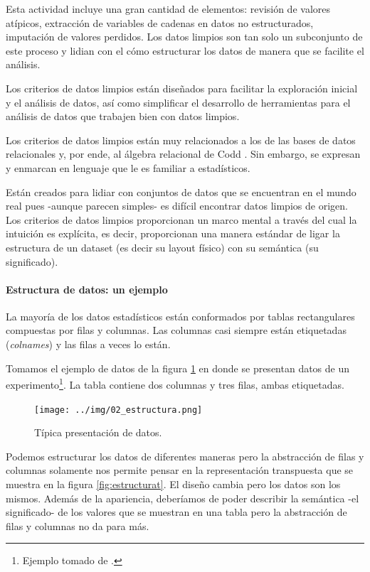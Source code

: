 \documentclass[]{article}
\let\oldparagraph\paragraph
\renewcommand{\paragraph}[1]{\oldparagraph{#1}\mbox{}}
\let\rmarkdownfootnote\footnote%
\def\footnote{\protect\rmarkdownfootnote}
\begin{document}
Esta actividad incluye una gran cantidad de elementos: revisión de
valores atípicos, extracción de variables de cadenas en datos no
estructurados, imputación de valores perdidos. Los datos limpios son tan
solo un subconjunto de este proceso y lidian con el cómo estructurar los
datos de manera que se facilite el análisis.

Los criterios de datos limpios están diseñados para facilitar la
exploración inicial y el análisis de datos, así como simplificar el
desarrollo de herramientas para el análisis de datos que trabajen bien
con datos limpios.

Los criterios de datos limpios están muy relacionados a los de las bases
de datos relacionales y, por ende, al álgebra relacional de Codd
\parencite{wickham2014tidy}. Sin embargo, se expresan y enmarcan en
lenguaje que le es familiar a estadísticos.

Están creados para lidiar con conjuntos de datos que se encuentran en el
mundo real pues -aunque parecen simples- es difícil encontrar datos
limpios de origen. Los criterios de datos limpios proporcionan un marco
mental a través del cual la intuición es explícita, es decir,
proporcionan una manera estándar de ligar la estructura de un dataset
(es decir su layout físico) con su semántica (su significado).

\paragraph{Estructura de datos: un
ejemplo}\label{estructura-de-datos-un-ejemplo}

La mayoría de los datos estadísticos están conformados por tablas
rectangulares compuestas por filas y columnas. Las columnas casi siempre
están etiquetadas (\emph{colnames}) y las filas a veces lo están.

Tomamos el ejemplo de datos de la figura \ref{fig:estructura} en donde
se presentan datos de un
experimento\footnote{Ejemplo tomado de \parencite[][p. 3]{wickham2014tidy}.}.
La tabla contiene dos columnas y tres filas, ambas etiquetadas.

\begin{figure}[h]
    \centering
    \texttt{[image: ../img/02\_estructura.png]}
    \caption{Típica presentación de datos.}
    \label{fig:estructura}
\end{figure}

Podemos estructurar los datos de diferentes maneras pero la abstracción
de filas y columnas solamente nos permite pensar en la representación
transpuesta que se muestra en la figura \ref{fig:estructurat}. El diseño
cambia pero los datos son los mismos. Además de la apariencia,
deberíamos de poder describir la semántica -el significado- de los
valores que se muestran en una tabla \parencite[][p. 3]{wickham2014tidy}
pero la abstracción de filas y columnas no da para más.
\end{document}
